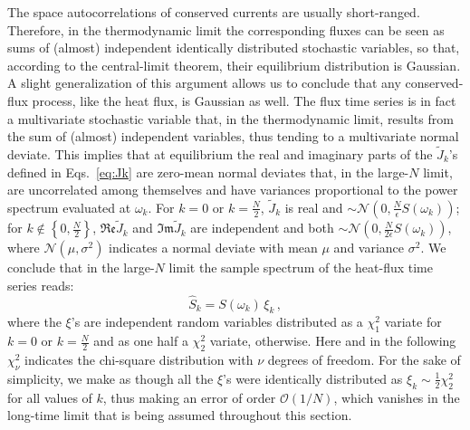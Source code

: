 The space autocorrelations of conserved currents are usually short-ranged. Therefore, in the thermodynamic limit the corresponding fluxes can be seen as sums of (almost) independent identically distributed stochastic variables, so that, according to the central-limit theorem, their equilibrium distribution is Gaussian. A slight generalization of this argument allows us to conclude that any conserved-flux process, like the heat flux, is Gaussian as well. The flux time series is in fact a multivariate stochastic variable that, in the thermodynamic limit, results from the sum of (almost) independent variables, thus tending to a multivariate normal deviate. This implies that at equilibrium the real and imaginary parts of the $\tilde J_k$'s defined in Eqs.~\eqref{eq:Jk} are zero-mean normal deviates that, in the large-$N$ limit, are uncorrelated among themselves and have variances proportional to the power spectrum evaluated at $\omega_k$. For $k=0$ or $k=\frac{N}{2}$, $\tilde J_k$ is real and $\sim \mathcal{N}\left (0, \frac{N}{\epsilon}S(\omega_k) \right )$; for $k\notin\left\{ 0,\frac{N}{2}\right\}$, $\mathfrak{Re}\tilde{J}_k$ and $\mathfrak{Im}\tilde{J}_k$ are independent and both  $\sim \mathcal{N}\left (0, \frac{N}{2 \epsilon}S(\omega_k) \right )$, where $\mathcal{N} (\mu,\sigma^2)$ indicates a normal deviate with mean $\mu$ and variance $\sigma^2$. We conclude that in the large-$N$ limit the sample spectrum of the heat-flux time series reads:
\begin{equation}
\hat{S}_{k} = S(\omega_k) \,\xi_{k} \,, \label{eq:periodogram-distribution}
\end{equation}
where the $ {\xi}$'s are independent random variables distributed as a $\chi_1^2$ variate for $k=0$ or $k=\frac{N}{2}$ and as one half a $\chi_2^2$ variate, otherwise. Here and in the following $\chi^2_\nu$ indicates the chi-square distribution with $\nu$ degrees of freedom. For the sake of simplicity, we make as though all the ${\xi}$'s were identically distributed as $\xi_k \sim \frac{1}{2} \chi_2^2$ for all values of $k$, thus making an error of order $\mathcal{O}(1/N)$, which vanishes in the long-time limit that is being assumed throughout this section.


